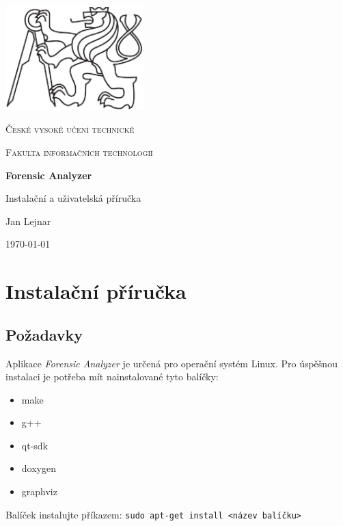 \documentclass[a4paper,12pt]{article}
\begin{document}
\begin{titlepage}
	\centering
	\includegraphics[width=0.4\textwidth]{cvut-logo-bw}\par\vspace{1cm}
	{\scshape\LARGE České vysoké učení technické \par}
	\vspace{1cm}
	{\scshape\Large Fakulta informačních technologií\par}
	\vspace{1.5cm}
	{\huge\bfseries Forensic Analyzer\par} 
	\vspace{1.5cm}
	{\huge Instalační a uživatelská příručka \par}
	\vspace{2cm}
	
	{Jan Lejnar \par}
	\vfill
	
	{\large \today\par}
\end{titlepage}
	
\tableofcontents
\newpage	

\section{Instalační příručka}
\subsection{Požadavky}
Aplikace \textit{Forensic Analyzer} je určená pro operační systém Linux. Pro úspěšnou instalaci je potřeba mít nainstalované tyto balíčky:
\begin{itemize}
	\item make
	\item g++
	\item qt-sdk
	\item doxygen
	\item graphviz
\end{itemize}

Balíček instalujte příkazem: \texttt{sudo apt-get install <název balíčku>}
\end{document}
